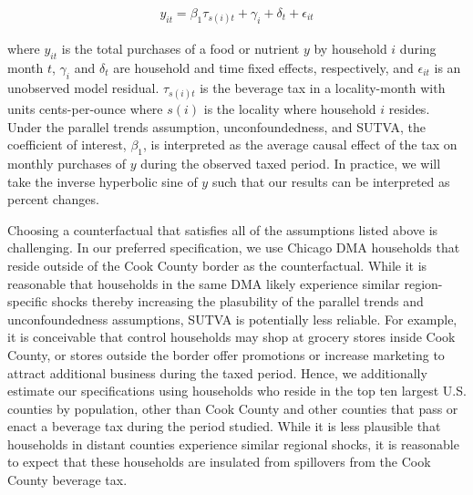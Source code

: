 \documentclass[12pt]{article}
\begin{document}
\begin{align}
	y_{it} = \beta_1 \tau_{s(i)t} + \gamma_i + \delta_t + \epsilon_{it} \label{spec_did}
\end{align}

where $y_{it}$ is the total purchases of a food or nutrient $y$ by household $i$ during month $t$, $\gamma_i$ and $\delta_t$ are household and time fixed effects, respectively, and $\epsilon_{it}$ is an unobserved model residual. $\tau_{s(i)t}$ is the beverage tax in a locality-month with units cents-per-ounce where $s(i)$ is the locality where household $i$ resides. Under the parallel trends assumption, unconfoundedness, and SUTVA, the coefficient of interest, $\beta_1$, is interpreted as the average causal effect of the tax on monthly purchases of $y$ during the observed taxed period. In practice, we will take the inverse hyperbolic sine of $y$ such that our results can be interpreted as percent changes.

Choosing a counterfactual that satisfies all of the assumptions listed above is challenging. In our preferred specification, we use Chicago DMA households that reside outside of the Cook County border as the counterfactual. While it is reasonable that households in the same DMA likely experience similar region-specific shocks thereby increasing the plasubility of the parallel trends and unconfoundedness assumptions, SUTVA is potentially less reliable. For example, it is conceivable that control households may shop at grocery stores inside Cook County, or stores outside the border offer promotions or increase marketing to attract additional business during the taxed period. Hence, we additionally estimate our specifications using households who reside in the top ten largest U.S. counties by population, other than Cook County and other counties that pass or enact a beverage tax during the period studied. While it is less plausible that households in distant counties experience similar regional shocks, it is reasonable to expect that these households are insulated from spillovers from the Cook County beverage tax.

\end{document}
